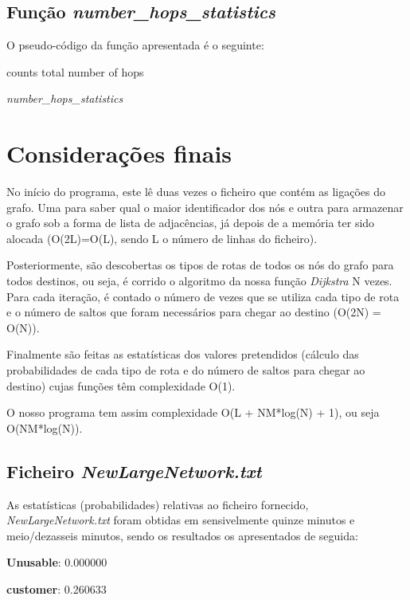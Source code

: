 \documentclass[a4paper]{article}
\begin{document}
\subsection{Função \textit{number\_hops\_statistics}}
O pseudo-código da função apresentada é o seguinte:

\begin{algorithm}[H]
 counts total number of hops\;
 
 
 \caption{\textit{number\_hops\_statistics}}
\end{algorithm}

\section{Considerações finais}
No início do programa, este lê duas vezes o ficheiro que contém as ligações do grafo. Uma para saber qual o maior identificador dos nós e outra para armazenar o grafo sob a forma de lista de adjacências, já depois de a memória ter sido alocada (O(2L)=O(L), sendo L o número de linhas do ficheiro).

Posteriormente, são descobertas os tipos de rotas de todos os nós do grafo para todos destinos, ou seja, é corrido o algoritmo da nossa função \textit{Dijkstra} N vezes. Para cada iteração, é contado o número de vezes que se utiliza cada tipo de rota e o número de saltos que foram necessários para chegar ao destino (O(2N) = O(N)).

Finalmente são feitas as estatísticas dos valores pretendidos (cálculo das probabilidades de cada tipo de rota e do número de saltos para chegar ao destino) cujas funções têm complexidade O(1).

O nosso programa tem assim complexidade O(L + NM*log(N) + 1), ou seja O(NM*log(N)).

\subsection{Ficheiro \textit{NewLargeNetwork.txt}}
As estatísticas (probabilidades) relativas ao ficheiro fornecido, \textit{NewLargeNetwork.txt} foram obtidas em sensivelmente quinze minutos e meio/dezasseis minutos, sendo os resultados os apresentados de seguida:

\textbf{Unusable}: 0.000000

\textbf{customer}: 0.260633
\end{document}
